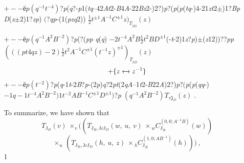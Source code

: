 \documentclass[a4paper,12pt]{article}
\begin{document}
$+--ё p (q^{-1}t^{-4})$?{\it p}({\it q}?-{\it p}1({\it tq}--42{\it At}2-{\it B}4{\it A}-22{\it Bz}2-)2?){\it p}?({\it p}({\it p}({\it tq}-)4-21{\it zt}2$\pm$)1?{\it Bp D}({\it z}$\pm$2)1?{\it zp}) $($?{\it qp}-(1({\it pzq}2)) $\displaystyle \frac{1}{2}t^{\pm 1}A^{-1}C^{\pm 1}z)_{T_{\tilde{\mathrm{J}}D}}(z)$

$+--ё p (q^{-1}A^{2}B^{-2})$?{\it p}(?({\it pp q}({\it q}) $-2t^{-4}A^{2}B\displaystyle \frac{1}{2}t^{2}BD^{\pm 1}$(-{\it t}-2)1{\it z}?{\it p})$\pm$({\it z}12))??{\it pp}$(((pt4qz)-2)\displaystyle \frac{1}{2}t^{2}A^{-1}C^{\pm 1}(t^{-1}z)^{\pm 1})_{T_{\tilde{\mathrm{J}}D}}(z)$
$$
+\{z\xleftrightarrow{}z^{-1}\}
$$
$+--ё p (t^{-2})$?{\it p}({\it q}-1{\it t}-2{\it B}?{\it p}-(2{\it p}){\it q}?2{\it pt}(2{\it qA}--1{\it t}2-{\it B}22{\it A})2?){\it p}?$(${\it p}({\it p}({\it qq}-) $-1q-1t^{-4}A^{2}B^{-2})1t^{-2}AB^{-1}C^{\pm 1}D^{\pm 1})$?{\it p} $(q^{-1}A^{2}B^{-2})T_{\tau \mathfrak{J}_{D}}(z)$ .

To summarize, we have shown that
$$
T_{\mathrm{J}_{D}}(v)\ \times_{v}((T_{\mathrm{J}_{B},\mathrm{J}c\mathrm{J}_{D}}(w,\ u,\ v)\ \times {}_{w}C_{\mathrm{J}_{B}}^{(0,0;A^{-1}B)}(w))
$$
$$
\times_{u}\ (T_{\mathrm{J}_{B},\mathrm{J}c\mathrm{J}_{D}}(h,\ u,\ z)\ \times {}_{h}C_{\mathrm{J}_{B}}^{(1,0;AB^{-1})}(h)))\ ,
$$
1
\end{document}
